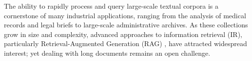 



The ability to rapidly process and query large-scale textual corpora is a cornerstone of many industrial applications, ranging from the analysis of medical records and legal briefs to large-scale administrative archives. As these collections grow in size and complexity, advanced approaches to information retrieval (IR), particularly Retrieval-Augmented Generation (RAG) , have attracted widespread interest; yet dealing with long documents remains an open challenge.


